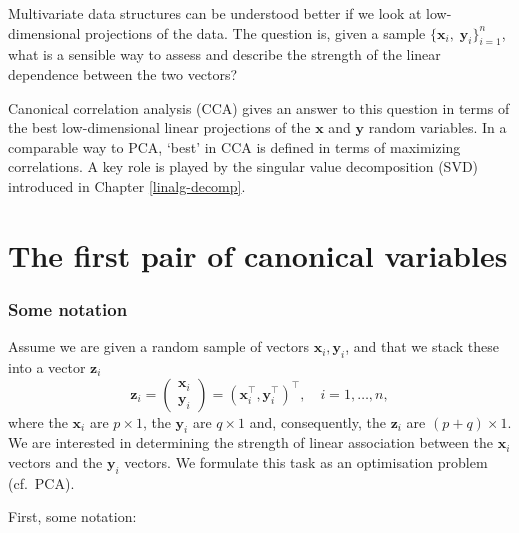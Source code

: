 \documentclass[
]{book}
\theoremstyle{definition}
\theoremstyle{definition}
\theoremstyle{definition}
\theoremstyle{definition}
\theoremstyle{remark}
\begin{document}
Multivariate data structures can be understood better if we look at low-dimensional projections of the data. The question is, given a sample \(\{\mathbf x_i, \; \mathbf y_i\}_{i=1}^{n}\), what is a sensible way to assess and describe the strength of the linear dependence between the two vectors?

Canonical correlation analysis (CCA) gives an answer to this question in terms of the best low-dimensional linear projections of the \(\mathbf x\) and \(\mathbf y\) random variables. In a comparable way to PCA, `best' in CCA is defined in terms of maximizing correlations.
A key role is played by the singular value decomposition (SVD) introduced in Chapter \ref{linalg-decomp}.

\hypertarget{cca1}{%
\section{The first pair of canonical variables}\label{cca1}}

\hypertarget{some-notation}{%
\subsubsection*{Some notation}\label{some-notation}}

Assume we are given a random sample of vectors \(\mathbf x_i, \mathbf y_i\), and that we stack these into a vector \(\mathbf z_i\)
\[
\mathbf z_i=\left(\begin{array}{c}
\mathbf x_i\\
\mathbf y_i
\end{array}\right)=(\mathbf x_i^\top , \mathbf y_i^\top )^\top,\quad  i=1,\ldots, n,
\]
where
the \(\mathbf x_i\) are \(p \times 1\), the \(\mathbf y_i\) are \(q \times 1\) and, consequently, the \(\mathbf z_i\) are \((p+q)\times 1\). We are interested in determining the strength of linear association between the \(\mathbf x_i\) vectors and the \(\mathbf y_i\) vectors.
We formulate this task as an optimisation problem (cf.~PCA).

First, some notation:
\end{document}
